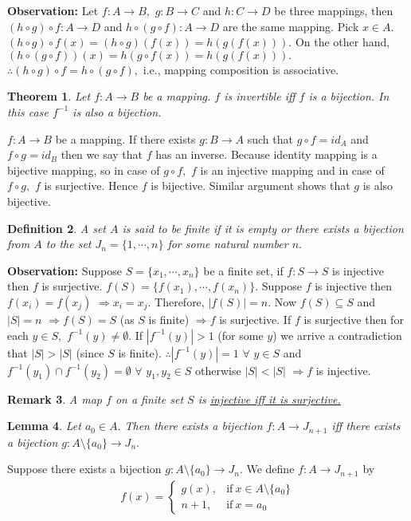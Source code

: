 \documentclass[11pt]{amsart}
\newtheorem{theorem}{Theorem}[section]
\newtheorem{definition}[theorem]{Definition}%
\newtheorem{remark}[theorem]{Remark}%
\newtheorem{lemma}[theorem]{Lemma}%
\begin{document}
\newline \textbf{Observation:} Let $f: A \rightarrow B,$ $g: B \rightarrow C$ and $h: C \rightarrow D$ be three mappings, then $(h\circ g)\circ f: A \rightarrow D$ and $h\circ (g\circ f): A \rightarrow D$ are the same mapping. Pick $x \in A$. $(h\circ g)\circ f(x)
=(h\circ g)(f(x))=h(g(f(x))).$ On the other hand, $(h\circ (g\circ f))(x)=h(g\circ f(x))=h(g(f(x))).$ $\therefore (h\circ g)\circ f= h\circ (g \circ f),$ i.e., mapping composition is associative. 
\begin{theorem}
Let $f:A \rightarrow B$ be a mapping. $f$ is invertible iff $f$ is a bijection. In this case $f^{-1}$ is also a bijection.
\end{theorem}
\proof $f:A \rightarrow B$ be a mapping. If there exists $g: B \rightarrow A$ such that $g\circ f=id_{A}$ and $f\circ g=id_{B}$ then we say that $f$ has an inverse. Because identity mapping is a bijective mapping, so in case of $g\circ f,$ $f$ is an injective mapping and in case of $f\circ g,$ $f$ is surjective. Hence $f$ is bijective. Similar argument shows that $g$ is also bijective.
\begin{definition}
A set $A$ is said to be finite if it is empty or there exists a bijection from $A$ to the set $J_n=\{1,\cdots ,n\}$ for some natural number $n.$
\end{definition}
\textbf{Observation:} Suppose $S=\{x_{1},\cdots, x_{n} \}$ be a finite set, if $f: S\rightarrow S$ is injective then $f$ is surjective. $f(S)=\{f(x_{1}),\cdots,f(x_{n}) \}.$ Suppose $f$ is injective then $f(x_{i})=f(x_{j})$ $\Rightarrow x_{i}=x_{j}.$ Therefore, $\mid f(S) \mid =n.$ Now $f(S) \subseteq S$ and $\mid S \mid =n$ $\Rightarrow f(S)=S$ (as $S$ is finite) $\Rightarrow f $ is surjective. If $f$ is surjective then for each $y \in S,$ $f^{-1}(y) \neq \emptyset.$ If $|f^{-1}(y)| > 1$ (for some $y$) we arrive a contradiction that $|S| > |S|$ (since $S$ is finite). $\therefore |f^{-1}(y)|=1$ $\forall$ $y \in S$ and $f^{-1}(y_{1}) \cap f^{-1}(y_{2}) = \emptyset$ $\forall$ $ y_{1},y_{2} \in S$ otherwise $|S| < |S|$ $\Rightarrow f$ is injective.
\begin{remark}
A map $f$ on a finite set $S$ is \underline{injective iff it is surjective.}
\end{remark}
\begin{lemma}
Let $a_0\in A.$ Then there exists a bijection $f:A\to J_{n+1}$ iff there exists a bijection $g:A\setminus \{a_0\}\to J_n.$
\end{lemma}
\proof Suppose there exists a bijection $g:A\setminus \{a_0\}\to J_n$. We define $f:A\to J_{n+1}$ by \begin{align*}
f(x)=
    \begin{cases}
        g(x), &   \text{if}~x\in A\setminus\{a_0\}\\
        n+1, &   \text{if}~x=a_0
    \end{cases}
\end{align*}
\end{document}
